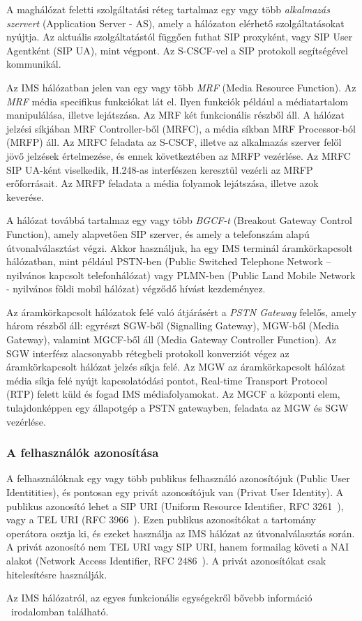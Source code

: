 A maghálózat feletti szolgáltatási réteg tartalmaz egy vagy több \emph{alkalmazás szervert} (Application Server - AS), amely a hálózaton elérhető szolgáltatásokat nyújtja. Az aktuális szolgáltatástól függően futhat SIP proxyként, vagy SIP User Agentként (SIP UA), mint végpont. Az S-CSCF-vel a SIP protokoll segítségével kommunikál.

Az IMS hálózatban jelen van egy vagy több \emph{MRF} (Media Resource Function). Az \emph{MRF} média specifikus funkciókat lát el. Ilyen funkciók például a médiatartalom manipulálása, illetve lejátszása. Az MRF két funkcionális részből áll. A hálózat jelzési síkjában MRF Controller-ből (MRFC), a média síkban MRF Processor-ból (MRFP) áll.  Az MRFC feladata az S-CSCF, illetve az alkalmazás szerver felől jövő jelzések értelmezése, és ennek következtében az MRFP vezérlése. Az MRFC SIP UA-ként viselkedik, H.248-as interfészen keresztül vezérli az MRFP erőforrásait. Az MRFP feladata a média folyamok lejátszása, illetve azok keverése. 

A hálózat továbbá tartalmaz egy vagy több \emph{BGCF-t} (Breakout Gateway Control Function), amely alapvetően SIP szerver, és amely a telefonszám alapú útvonalválasztást végzi. Akkor használjuk, ha egy IMS terminál áramkörkapcsolt hálózatban, mint például PSTN-ben (Public Switched Telephone Network – nyilvános kapcsolt telefonhálózat) vagy PLMN-ben (Public Land Mobile Network - nyilvános földi mobil hálózat) végződő hívást kezdeményez.

Az áramkörkapcsolt hálózatok felé való átjárásért a \emph{PSTN Gateway} felelős, a\-mely három részből áll: egyrészt SGW-ből (Signalling Gateway), MGW-ből (Media Gateway), valamint MGCF-ből áll (Media Gateway Controller Function). Az SGW interfész alacsonyabb rétegbeli protokoll konverziót végez az áramkörkapcsolt hálózat jelzés síkja felé. Az MGW az áramkörkapcsolt hálózat média síkja felé nyújt kapcsolatódási pontot, Real-time Transport Protocol (RTP) felett küld és fogad IMS médiafolyamokat. Az MGCF a központi elem, tulajdonképpen egy állapotgép a PSTN gatewayben, feladata az MGW és SGW vezérlése.

\subsubsection{A felhasználók azonosítása}

A felhasználóknak egy vagy több publikus felhasználó azonosítójuk (Public User Identitities), és pontosan egy privát azonosítójuk van (Privat User Identity). A publikus azonosító lehet a SIP URI (Uniform Resource Identifier, RFC 3261~\cite{rfc3261}), vagy a TEL URI (RFC 3966~\cite{rfc3966}). Ezen publikus azonosítókat a tartomány operátora osztja ki, és ezeket használja az IMS hálózat az útvonalválasztás során. A privát azonosító nem TEL URI vagy SIP URI, hanem formailag követi a NAI alakot (Network Access Identifier, RFC 2486~\cite{rfc2486}). A privát azonosítókat csak hitelesítésre használják.

\medskip

Az IMS hálózatról, az egyes funkcionális egységekről bővebb információ ~irodalomban található.

